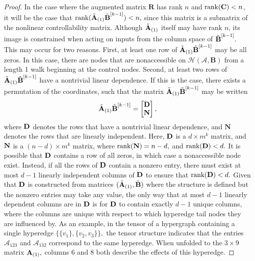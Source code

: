 \documentclass[journal,twoside,web]{ieeecolor}
\newcommand{\rank}{\text{rank}}
\newcommand{\Bv}{\mathbf{B}}
\newcommand{\Nv}{\mathbf{N}}
\newcommand{\Rv}{\mathbf{R}}
\newcommand{\At}{\mathscr{A}}
\newcommand{\Hs}{\mathcal{H}}
\begin{document}
\begin{proof}
    In the case where the augmented matrix $\Rv$ has rank $n$ and $\rank(\textbf C)<n$, it will be the case that $\rank(\tilde{\textbf A}_{(1)}\tilde{\textbf B}^{[k-1]})<n,$ since this matrix is a submatrix of the nonlinear controllability matrix.
    Although $\tilde{\textbf A}_{(1)}$ itself may have rank $n$, its image is constrained when acting on inputs from the column space of $\tilde{\textbf B}^{[k-1]}.$ This may occur for two reasons. First, at least one row of $\tilde{\textbf A}_{(1)}\tilde{\textbf B}^{[k-1]}$ may be all zeros. In this case, there are nodes that are nonaccessible on $\Hs(\At,\Bv)$ from a length 1 walk beginning at the control nodes. Second, at least two rows of $\tilde{\textbf A}_{(1)}\tilde{\textbf B}^{[k-1]}$ have a nontrivial linear dependence. If this is the case, there exists a permutation of the coordinates, such that the matrix $\tilde{\textbf A}_{(1)}\tilde{\textbf B}^{[k-1]}$ may be written
        \begin{equation*}
            \tilde{\textbf A}_{(1)}\tilde{\textbf B}^{[k-1]}=\begin{bmatrix}
                \textbf D\\
                \textbf N
            \end{bmatrix},
        \end{equation*}
        where $\textbf D$ denotes the rows that have a nontrivial linear dependence, and $\Nv$ denotes the rows that are linearly independent. Here, $\textbf D$ is a $d\times m^{k}$ matrix, and $\textbf N$ is a $(n-d)\times m^{k}$ matrix, where $\rank(\textbf N)=n-d,$ and $\rank(\textbf D)<d.$ It is possible that $\textbf D$ contains a row of all zeros, in which case a nonaccessible node exist.
        Instead, if all the rows of $\textbf D$ contain a nonzero entry, there must exist at most $d-1$ linearly independent columns of $\textbf D$ to ensure that $\rank(\textbf D)<d.$
        Given that $\textbf D$ is constructed from matrices $(\tilde{\textbf A}_{(1)}, \tilde{\textbf B})$ where the structure is defined but the nonzero entries may take any value, the only way that at most $d-1$ linearly dependent columns are in $\textbf D$ is for $\textbf D$ to contain exactly $d-1$ unique columns, where the columns are unique with respect to which hyperedge tail nodes they are influenced by. As an example, in the tensor of a hypergraph containing a single hyperedge $\{\{v_1\},\{v_2,v_3\}\},$ the tensor structure indicates that the entries $\mathscr A_{123}$ and $\At_{132}$ correspond to the same hyperedge. When unfolded to the $3\times 9$ matrix $\textbf A_{(1)},$ columns 6 and 8 both describe the effects of this hyperedge. 


\end{proof}
\end{document}
